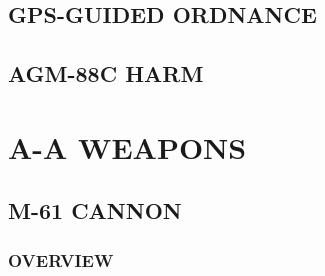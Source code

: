 \documentclass[fontInter]{TechCheck}
\begin{document}
	\clearpage 

	\section{GPS-GUIDED ORDNANCE}

	\clearpage 

	\section{AGM-88C HARM}

	\cleardoublepage

	\chapter{A-A WEAPONS}
	\minitoc
	\cleardoublepage

	\section{M-61 CANNON}

	\subsection{OVERVIEW}

	\clearpage
\end{document}
